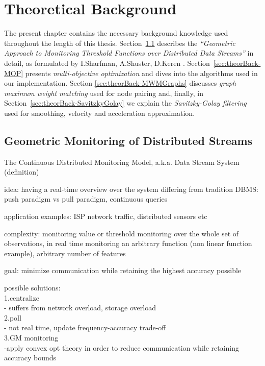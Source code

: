 \chapter{Theoretical Background} \label{chap:theorBack}

The present chapter contains the necessary background knowledge used throughout the length of this thesis. Section~\ref{sec:theorBack-GM} describes the \emph{``Geometric Approach to Monitoring Threshold Functions over Distributed Data Streams''} in detail, as formulated by I.Sharfman, A.Shuster, D.Keren \cite{GM-sharfmanShusterKeren}. Section~\ref{sec:theorBack-MOP} presents \emph{multi-objective optimization} and  dives into the algorithms used in our implementation. Section \ref{sec:theorBack-MWMGraphs} discusses \emph{graph maximum weight matching} used for node pairing and, finally, in Section~\ref{sec:theorBack-SavitzkyGolay} we explain the \emph{Savitzky-Golay filtering} used for smoothing, velocity and acceleration approximation.


\section{Geometric Monitoring of Distributed Streams} \label{sec:theorBack-GM}

The Continuous Distributed Monitoring Model, a.k.a. Data Stream System (definition)

idea: having a real-time overview over the system
	differing from tradition DBMS: push paradigm vs pull paradigm, continuous queries

application examples: ISP network traffic, distributed sensors etc

complexity: monitoring value or threshold monitoring over the whole set of observations, in real time
			monitoring an arbitrary function (non linear function example), 
			arbitrary number of features

goal: minimize communication while retaining the highest accuracy possible

possible solutions:\\
	1.centralize\\
		- suffers from network overload, storage overload\\
	2.poll\\
		- not real time, update frequency-accuracy trade-off\\
	3.GM monitoring\\
	    -apply convex opt theory in order to reduce communication while retaining accuracy bounds

